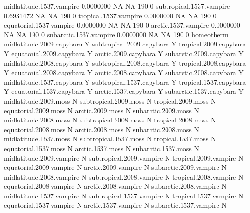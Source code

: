 \documentclass{article}
\numberwithin{exercise}{section}
\begin{document}
\begin{Schunk}
\begin{Soutput}
midlatitude.1537.vampire  0.0000000          NA            NA       190              0
subtropical.1537.vampire  0.6931472          NA            NA       190              0
tropical.1537.vampire     0.0000000          NA            NA       190              0
equatorial.1537.vampire   0.0000000          NA            NA       190              0
arctic.1537.vampire       0.0000000          NA            NA       190              0
subarctic.1537.vampire    0.0000000          NA            NA       190              0
                          homeotherm
midlatitude.2009.capybara          Y
subtropical.2009.capybara          Y
tropical.2009.capybara             Y
equatorial.2009.capybara           Y
arctic.2009.capybara               Y
subarctic.2009.capybara            Y
midlatitude.2008.capybara          Y
subtropical.2008.capybara          Y
tropical.2008.capybara             Y
equatorial.2008.capybara           Y
arctic.2008.capybara               Y
subarctic.2008.capybara            Y
midlatitude.1537.capybara          Y
subtropical.1537.capybara          Y
tropical.1537.capybara             Y
equatorial.1537.capybara           Y
arctic.1537.capybara               Y
subarctic.1537.capybara            Y
midlatitude.2009.moss              N
subtropical.2009.moss              N
tropical.2009.moss                 N
equatorial.2009.moss               N
arctic.2009.moss                   N
subarctic.2009.moss                N
midlatitude.2008.moss              N
subtropical.2008.moss              N
tropical.2008.moss                 N
equatorial.2008.moss               N
arctic.2008.moss                   N
subarctic.2008.moss                N
midlatitude.1537.moss              N
subtropical.1537.moss              N
tropical.1537.moss                 N
equatorial.1537.moss               N
arctic.1537.moss                   N
subarctic.1537.moss                N
midlatitude.2009.vampire           N
subtropical.2009.vampire           N
tropical.2009.vampire              N
equatorial.2009.vampire            N
arctic.2009.vampire                N
subarctic.2009.vampire             N
midlatitude.2008.vampire           N
subtropical.2008.vampire           N
tropical.2008.vampire              N
equatorial.2008.vampire            N
arctic.2008.vampire                N
subarctic.2008.vampire             N
midlatitude.1537.vampire           N
subtropical.1537.vampire           N
tropical.1537.vampire              N
equatorial.1537.vampire            N
arctic.1537.vampire                N
subarctic.1537.vampire             N
\end{Soutput}
\end{Schunk}
\end{document}
